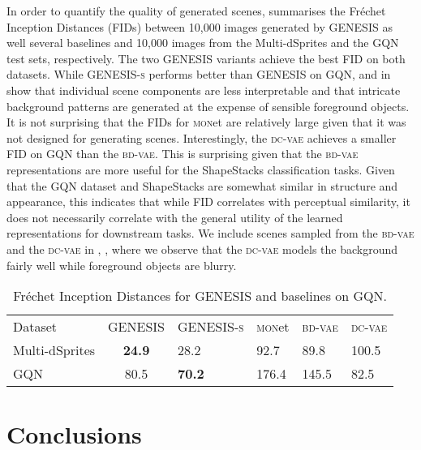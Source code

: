 \documentclass{article}
\begin{document}
In order to quantify the quality of generated scenes,  summarises the Fr\'{e}chet Inception Distances (FIDs) \citep{heusel2017gans} between 10,000 images generated by \gls{GENESIS} as well several baselines and 10,000 images from the Multi-dSprites and the GQN test sets, respectively.
The two \gls{GENESIS} variants achieve the best FID on both datasets.
While \gls{GENESIS}\textsc{-s} performs better than \gls{GENESIS} on GQN,  and  in  show that individual scene components are less interpretable and that intricate background patterns are generated at the expense of sensible foreground objects.
It is not surprising that the FIDs for \textsc{mon}et are relatively large given that it was not designed for generating scenes.
Interestingly, the \textsc{dc-vae} achieves a smaller FID on GQN than the \textsc{bd-vae}.
This is surprising given that the \textsc{bd-vae} representations are more useful for the ShapeStacks classification tasks.
Given that the GQN dataset and ShapeStacks are somewhat similar in structure and appearance, this indicates that while FID correlates with perceptual similarity, it does not necessarily correlate with the general utility of the learned representations for downstream tasks.
We include scenes sampled from the \textsc{bd-vae} and the \textsc{dc-vae} in , , where we observe that the \textsc{dc-vae} models the background fairly well while foreground objects are blurry.


\begin{table}[h!]
    \centering
    \caption{Fr\'{e}chet Inception Distances for \gls{GENESIS} and baselines on GQN.}
    \label{tab:fid}
    \begin{tabularx}{0.8\textwidth}{l c*{4}{Y}}
        \toprule
        Dataset & \gls{GENESIS} & \mbox{\gls{GENESIS}\textsc{-s}} & \textsc{mon}et & \textsc{bd-vae} & \textsc{dc-vae} \\
        \cmidrule(r){1-1} \cmidrule(lr){2-4} \cmidrule(r){5-6}
        Multi-dSprites & \textbf{24.9} & 28.2          & 92.7  & 89.8  & 100.5 \\
        GQN            & 80.5          & \textbf{70.2} & 176.4 & 145.5 & 82.5 \\
        \bottomrule
    \end{tabularx}
\end{table}

 \section{Conclusions}
\label{sec:conclusions}
\end{document}
